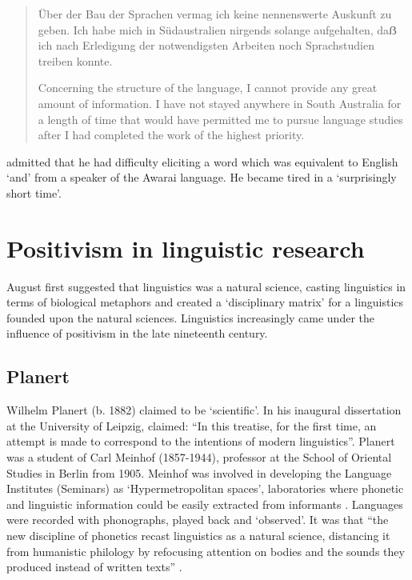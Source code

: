 \documentclass[output=paper]{langsci/langscibook}
\begin{document}
\begin{quote}
    Über der Bau der Sprachen vermag ich keine nennenswerte Auskunft zu geben. Ich habe mich in Südaustralien nirgends solange aufgehalten, da\textlatin{ẞ} ich nach Erledigung der notwendigsten Arbeiten noch Sprachstudien treiben konnte. 

    Concerning the structure of the language, I cannot provide any great amount of information. I have not stayed anywhere in South Australia for a length of time that would have permitted me to pursue language studies after I had completed the work of the highest priority. \citep[81]{eylmann_eingeborenen_1908}
\end{quote}

\citet[81]{eylmann_eingeborenen_1908} admitted that he had difficulty eliciting a word which was equivalent to English ‘and’ from a speaker of the Awarai language. He became tired in a ‘surprisingly short time’.

\section{Positivism in linguistic research}

August \citet{schleicher_sprachen_1983}  first suggested that linguistics was a natural science, casting linguistics in terms of biological metaphors and created a ‘disciplinary matrix’ for a linguistics founded upon the natural sciences. Linguistics increasingly came under the influence of positivism in the late nineteenth century.

\subsection{Planert}

Wilhelm Planert (b. 1882) claimed to be ‘scientific’. In his inaugural dissertation at the University of Leipzig, \citet{planert_syntaktischen_1907} claimed: “In this treatise, for the first time, an attempt is made to correspond to the intentions of modern linguistics”. Planert was a student of Carl Meinhof (1857-1944), professor at the School of Oriental Studies in Berlin from 1905. Meinhof was involved in developing the Language Institutes (Seminars) as ‘Hypermetropolitan spaces’, laboratories where phonetic and linguistic information could be easily extracted from informants \citep[138]{pugach_africa_2012}. Languages were recorded with phonographs, played back and ‘observed’. It was that “the new discipline of phonetics recast linguistics as a natural science, distancing it from humanistic philology by refocusing attention on bodies and the sounds they produced instead of written texts” \citep[93]{pugach_africa_2012}. 
\end{document}

